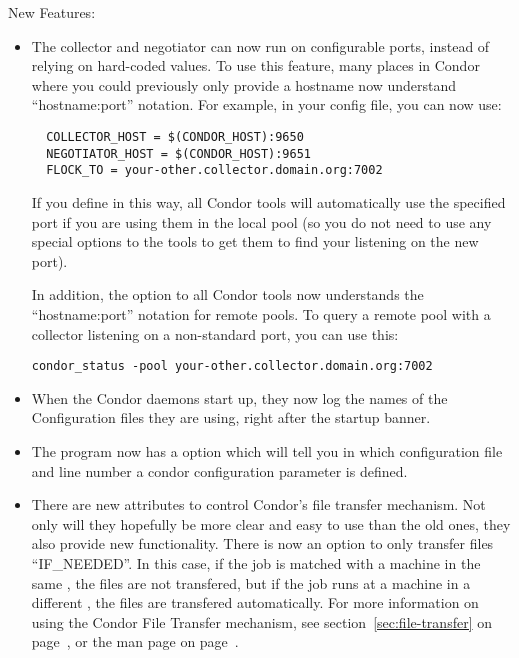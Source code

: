 \noindent New Features:
\begin{itemize}

\item The collector and negotiator can now run on configurable
ports, instead of relying on hard-coded values.
To use this feature, many places in Condor where you could previously
only provide a hostname now understand ``hostname:port'' notation.
For example, in your config file, you can now use:

\begin{verbatim}
  COLLECTOR_HOST = $(CONDOR_HOST):9650
  NEGOTIATOR_HOST = $(CONDOR_HOST):9651
  FLOCK_TO = your-other.collector.domain.org:7002
\end{verbatim}

If you define  in this way, all Condor tools
will automatically use the specified port if you are using them in the
local pool (so you do not need to use any special options to the tools
to get them to find your  listening on the new port).

In addition, the  option to all Condor tools now
understands the ``hostname:port'' notation for remote pools.
To query a remote pool with a collector listening on a non-standard
port, you can use this:

\begin{verbatim}
condor_status -pool your-other.collector.domain.org:7002
\end{verbatim}

\item When the Condor daemons start up, they now log the names of the
Configuration files they are using, right after the startup banner.

\item The  program now has a  option
  which will tell you in which configuration file and line number a
  condor configuration parameter is defined.

\item There are new attributes to control Condor's file transfer
  mechanism.
  Not only will they hopefully be more clear and easy to use than the
  old ones, they also provide new functionality.
  There is now an option to only transfer files ``IF\_NEEDED''.
  In this case, if the job is matched with a machine in the same
  , the files are not transfered, but if the
  job runs at a machine in a different , the
  files are transfered automatically.
  For more information on using the Condor File Transfer mechanism,
  see section~\ref{sec:file-transfer} on
  page~\pageref{sec:file-transfer}, or the  man
  page on page~\pageref{man-condor-submit}.


\end{itemize}
